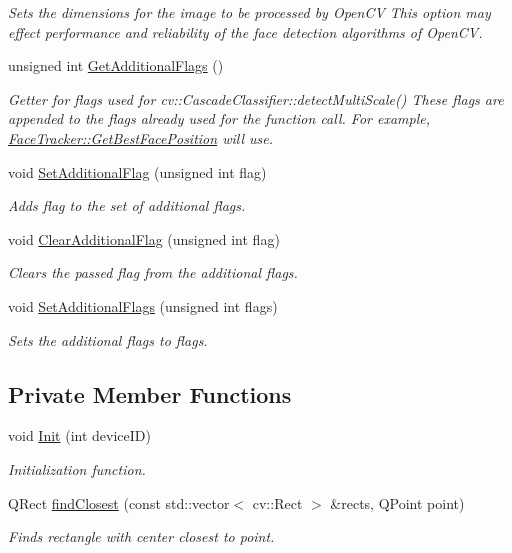 \begin{DoxyCompactItemize}
\begin{DoxyCompactList}\small\item\em Sets the dimensions for the image to be processed by Open\-C\-V This option may effect performance and reliability of the face detection algorithms of Open\-C\-V. \end{DoxyCompactList}\item 
unsigned int \hyperlink{class_face_tracker_aa89fea2366e81e1b7eeda5de64b72b9a}{Get\-Additional\-Flags} ()
\begin{DoxyCompactList}\small\item\em Getter for flags used for cv\-::\-Cascade\-Classifier\-::detect\-Multi\-Scale() These flags are appended to the flags already used for the function call. For example, \hyperlink{class_face_tracker_aff0b9cfb91df4eac94efe0cbfeae0f4f}{Face\-Tracker\-::\-Get\-Best\-Face\-Position} will use. \end{DoxyCompactList}\item 
void \hyperlink{class_face_tracker_a8efa0e58da5503bb16f21b0b5008af82}{Set\-Additional\-Flag} (unsigned int flag)
\begin{DoxyCompactList}\small\item\em Adds flag to the set of additional flags. \end{DoxyCompactList}\item 
void \hyperlink{class_face_tracker_abf0948b588ae71d555d61506cb8c8a4e}{Clear\-Additional\-Flag} (unsigned int flag)
\begin{DoxyCompactList}\small\item\em Clears the passed flag from the additional flags. \end{DoxyCompactList}\item 
void \hyperlink{class_face_tracker_a99fde78244336b63796b3c0467210213}{Set\-Additional\-Flags} (unsigned int flags)
\begin{DoxyCompactList}\small\item\em Sets the additional flags to flags. \end{DoxyCompactList}\end{DoxyCompactItemize}
\subsection*{Private Member Functions}
\begin{DoxyCompactItemize}
\item 
void \hyperlink{class_face_tracker_a189f02c677e1060792208c9ee1eb3222}{Init} (int device\-I\-D)
\begin{DoxyCompactList}\small\item\em Initialization function. \end{DoxyCompactList}\item 
Q\-Rect \hyperlink{class_face_tracker_abc157c27b7002840cf82faedc23a1b57}{find\-Closest} (const std\-::vector$<$ cv\-::\-Rect $>$ \&rects, Q\-Point point)
\begin{DoxyCompactList}\small\item\em Finds rectangle with center closest to point. \end{DoxyCompactList}\end{DoxyCompactItemize}
